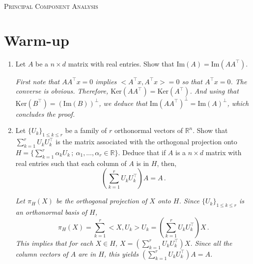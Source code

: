 \documentclass[a4paper,10pt,fleqn]{article}
\newcommand{\eqsp}{\,}
\newcommand{\rset}{\ensuremath{\mathbb{R}}}
\newcommand{\1}{\ensuremath{\mathbbm{1}}}
\newcommand{\bfA}{A}
\begin{document}

\noindent\hrulefill

\begin{center}
\textsc{Principal Component Analysis}
\end{center}
\hrulefill

\medskip


\section*{Warm-up}

\begin{enumerate}
\item Let $\bfA$ be a $n\times d$ matrix with real entries. Show that $\mathrm{Im}(\bfA)=\mathrm{Im}(\bfA \bfA^\top)$.

\vspace{.2cm}

{\em
    First note that $\bfA\bfA^\top x=0$ implies $<\bfA^\top x,\bfA^\top x>=0$ so that $\bfA^\top x=0$. The converse is obvious. Therefore, $\mathrm{Ker}(\bfA \bfA^\top)= \mathrm{Ker}(\bfA^\top)$. And using that $\mathrm{Ker}(B^\top)=(\mathrm{Im}(B))^\perp$, we deduce that $\mathrm{Im}(\bfA \bfA^\top)^\perp=\mathrm{Im}(\bfA)^\perp$, which concludes the proof.
}
    
\item Let $\{U_k\}_{1\leq k \leq r}$ be a family of $r$ orthonormal vectors of $\rset^n$.
Show that $\sum_{k=1}^{r} U_k U_k^\top$ is the matrix associated with the orthogonal projection onto $H=\{\sum_{k=1}^r \alpha_k U_k\,; \ \alpha_1,\ldots,\alpha_r \in \rset\}$. Deduce that if $\bfA$ is a $n\times d$ matrix with real entries such that each column of $\bfA$ is in $H$, then,
$$
\left(\sum_{k=1}^r U_k U_k^\top\right) \bfA=\bfA\eqsp.
$$

\vspace{.2cm}

{\em
Let $\pi_H(X)$ be the orthogonal projection of $X$ onto $H$. Since $\{U_k\}_{1\leq k \leq r}$  is an orthonormal basis of $H$,
$$
\pi_H(X)=\sum_{k=1}^{r} <X,U_k>U_k=\left(\sum_{k=1}^{r} U_k U_k^\top\right)X\eqsp.
$$
This implies that for each $X \in H$, $X=\left(\sum_{k=1}^{r} U_k U_k^\top\right)X$. Since all the column vectors of $A$ are in $H$, this yields $\left(\sum_{k=1}^r U_k U_k^\top\right) \bfA=\bfA$.
}
\end{enumerate}
\end{document}
